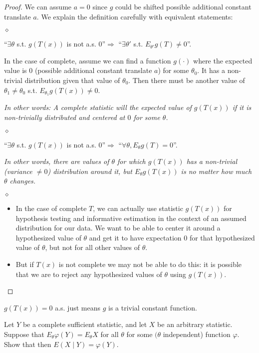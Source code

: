 \documentclass{article}
\begin{document}
\begin{proof} We can assume $a=0$ since $g$ could be shifted possible additional constant translate $a$. We explain the definition carefully with equivalent statements: 

$\diamond$ 

\centerline{``$\exists \theta$ s.t. $g(T(x))$ is not a.s. 0''$\Rightarrow$ ``$\exists \theta'$ s.t. $E_{\theta'} g(T)\ne 0$''.}

In the case of complete, assume we can find a function $g(\cdot)$ where the expected value is $0$ (possible additional constant translate $a$) for some $\theta_{0}$.  It has a non-trivial distribution given that value of $\theta_{0}$. Then there must be another value of $\theta_{1} \neq \theta_{0}$ s.t.  $E_{\theta_1}g(T(x))\ne 0$. 

\emph{In other words:
A complete statistic will  the expected value of $g(T(x))$ if it is non-trivially distributed and centered at $0$ for some $\theta$.}

$\diamond$ 

\centerline{``$\exists \theta$ s.t. $g(T(x))$ is not a.s. 0''$\Rightarrow$ ``$\forall \theta, E_{\theta} g(T)= 0$''.}

\emph{In other words, there are values of $\theta$ for which $g(T(x))$ has a non-trivial (variance $\ne 0$) distribution around it, but  $E_{\theta}g(T(x))$ is   no matter how much $\theta$ changes.}

$\diamond$ 

\begin{itemize}
    \item In the case of complete $T$, we can actually use statistic $g(T(x))$ for hypothesis testing and informative estimation in the context of an assumed distribution for our data. We want to be able to center it around a hypothesized value of $\theta$ and get it to have expectation 0 for that hypothesized value of $\theta$, but not for all other values of $\theta$.
    \item  But if $T(x)$ is not complete we may not be able to do this: it is possible that we are to reject any hypothesized values of $\theta$ using $g(T(x))$. 
\end{itemize}
\end{proof}
\begin{rema}
$g(T(x))=0$ a.s. just means $g$ is a trivial constant function.  
\end{rema}
\begin{cora}
Let $Y$ be a complete sufficient statistic, and let $X$ be an arbitrary statistic. Suppose that $E_\theta \varphi(Y)=E_\theta X$ for all $\theta$ for some $(\theta$ independent) function $\varphi$. Show that then $E(X \mid Y)=\varphi(Y)$.
\end{cora}
\end{document}
